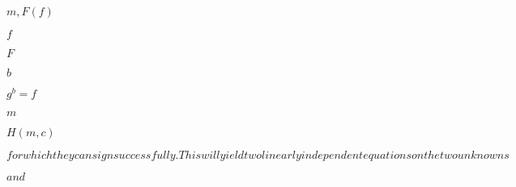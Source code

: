 \documentclass[10pt]{book}
\begin{document}
\begin{mdSnippets}
\begin{mdInlineSnippet}[144e2afd3382d3f25f79f6602b0b5967]%
$m,F(f)$\end{mdInlineSnippet}%
\begin{mdInlineSnippet}%
$f$\end{mdInlineSnippet}%
\begin{mdInlineSnippet}[800618943025315f869e4e1f09471012]%
$F$\end{mdInlineSnippet}%
\begin{mdInlineSnippet}%
$b$\end{mdInlineSnippet}%
\begin{mdInlineSnippet}[9bd123eb16910b3ff1ebfeb5ec54ea47]%
$g^b=f$\end{mdInlineSnippet}%
\begin{mdInlineSnippet}[6f8f57715090da2632453988d9a1501b]%
$m$\end{mdInlineSnippet}%
\begin{mdInlineSnippet}[b30d983384207908528512508f78d805]%
$H(m,c)$\end{mdInlineSnippet}%
\begin{mdInlineSnippet}%
$ for which they can sign successfully. This will yield two linearly independent equations on the two unknowns $\end{mdInlineSnippet}%
\begin{mdInlineSnippet}[0060636b449d1da5a8581bfee180f0c2]%
$ and $\end{mdInlineSnippet}%

\end{mdSnippets}
\end{document}
